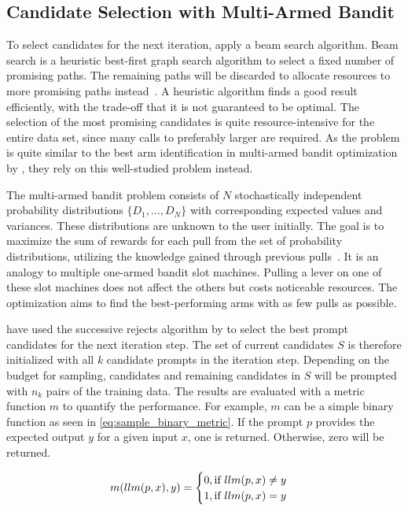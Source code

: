 \subsection{Candidate Selection with  Multi-Armed Bandit}
To select candidates for the next iteration, \citeauthor{pryzant2023AutomaticPrompt} apply a beam search algorithm.
Beam search is a heuristic best-first graph search algorithm to select a fixed number of promising paths.
The remaining paths will be discarded to allocate resources to more promising paths instead~\cite{BeamSearch}.
A heuristic algorithm finds a good result efficiently, with the trade-off that it is not guaranteed to be optimal.
The selection of the most promising candidates is quite resource-intensive for the entire data set, since many calls to preferably larger \LLMs are required.
As the problem is quite similar to the best arm identification in multi-armed bandit optimization by , they rely on this well-studied problem instead.

The multi-armed bandit problem consists of $N$ stochastically independent probability distributions $\{ D_1, \dots, D_N\}$ with corresponding expected values and variances.
These distributions are unknown to the user initially.
The goal is to maximize the sum of rewards for each pull from the set of probability distributions, utilizing the knowledge gained through previous pulls~\cite{kuleshov2014AlgorithmsMultiarmeda}.
It is an analogy to multiple one-armed bandit slot machines.
Pulling a lever on one of these slot machines does not affect the others but costs noticeable resources.
The optimization aims to find the best-performing arms with as few pulls as possible.

\citeauthor{pryzant2023AutomaticPrompt} have used the successive rejects algorithm by  to select the best prompt candidates for the next iteration step.
The set of current candidates $S$ is therefore initialized with all $k$ candidate prompts in the iteration step.
Depending on the budget for sampling, candidates and remaining candidates in $S$ will be prompted with $n_k$ pairs of the training data.
The results are evaluated with a metric function $m$ to quantify the performance.
For example, $m$ can be a simple binary function as seen in \autoref{eq:sample_binary_metric}.
If the prompt $p$ provides the expected output $y$ for a given input $x$, one is returned.
Otherwise, zero will be returned.

\begin{equation}
\label{eq:sample_binary_metric}
    m(llm(p, x), y) = 
    \begin{cases}
        0, \text{if $llm(p, x) \neq y$}\\
        1, \text{if $llm(p, x) = y$}
    \end{cases}
\end{equation}

